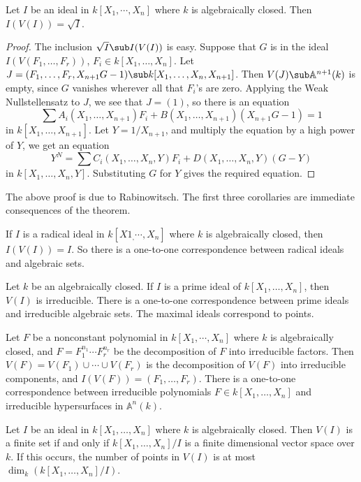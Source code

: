 \begin{theorem}
Let $I$ be an ideal in $k[X_1,\cdots,X_n]$ where $k$ is algebraically closed. Then $I(V(I))=\sqrt{I}$.
\end{theorem}
\begin{proof}
The inclusion $\sqrt{I}\sub I(V(I))$ is easy. Suppose that $G$ is in the ideal $I(V(F_1,\dots,F_r))$, $F_i\in k[X_1,\dots,X_n]$. Let $J=(F_1,\dots,F_r,X_{n+1}G-1)\sub k[X_1,\dots,X_n,X_{n+1}]$. Then $V(J)\sub\mathbb{A}^{n+1}(k)$ is empty, since $G$ vanishes wherever all that $F_i$'s are zero. Applying the Weak Nullstellensatz to $J$, we see that $J=(1)$, so there is an equation 
\[\sum A_i(X_1,\dots,X_{n+1})F_i+B(X_1,\dots,X_{n+1})(X_{n+1}G-1)=1\]
in $k[X_1,\dots,X_{n+1}]$. Let $Y=1/X_{n+1}$, and multiply the
equation by a high power of $Y$, we get an equation 
\[Y^N=\sum C_i(X_1,\dots,X_n,Y)F_i+D(X_1,\dots,X_n,Y)(G-Y)\]
in $k[X_1,\dots,X_n,Y]$. Substituting $G$ for $Y$ gives the required equation.
\end{proof}
The above proof is due to Rabinowitsch. The first three corollaries are immediate consequences of the theorem.
\begin{corollary}
If $I$ is a radical ideal in $k[X1_,\cdots,X_n]$ where $k$ is algebraically closed, then $I(V(I))=I$. So there is a one-to-one correspondence between radical ideals and algebraic sets.
\end{corollary}
\begin{corollary}
Let $k$ be an algebraically closed. If $I$ is a prime ideal of $k[X_1,\dots,X_n]$, then $V(I)$ is irreducible. There is a one-to-one correspondence between prime ideals and irreducible algebraic sets. The maximal ideals correspond to points.
\end{corollary}
\begin{corollary}\label{hypersurface decomposition}
Let $F$ be a nonconstant polynomial in $k[X_1,\cdots,X_n]$ where $k$ is algebraically closed, and $F=F_1^{n_1}\cdots F_r^{n_r}$ be the decomposition of $F$ into irreducible factors. Then $V(F)=V(F_1)\cup\cdots\cup V(F_r)$ is the decomposition of $V(F)$ into irreducible components, and $I(V(F))=(F_1,\dots,F_r)$. There is a one-to-one correspondence between irreducible polynomials $F\in k[X_1,\dots,X_n]$ and irreducible hypersurfaces in $\mathbb{A}^n(k)$.
\end{corollary}
\begin{proposition}\label{V(I) finite iff}
Let $I$ be an ideal in $k[X_1,\dots,X_n]$ where $k$ is algebraically closed. Then $V(I)$ is a finite set if and only if $k[X_1,\dots,X_n]/I$ is a finite dimensional vector space over $k$. If this occurs, the number of points in $V(I)$ is at most $\dim_k(k[X_1,\dots,X_n]/I)$.
\end{proposition}
